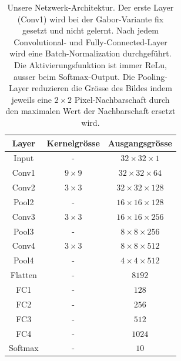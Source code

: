 \begin{table}
	\centering
	\begin{tabular}{|c|c|c|}
		\hline
		Layer & Kernelgrösse & Ausgangsgrösse \\ 
		\hline \hline
		Input & - & $32 \times 32 \times 1$ \\ 
		\hline 
		Conv1 & $9 \times 9$ &  $32 \times 32 \times 64$\\ 
		\hline 
		Conv2 & $3 \times 3$ &  $32 \times 32 \times 128$\\  
		\hline 
		Pool2 & - &  $16 \times 16 \times 128$\\ 
		\hline 
		Conv3 & $3 \times 3$ & $16 \times 16 \times 256$\\ 
		\hline 
		Pool3 & - &  $8 \times 8 \times 256$\\ 
		\hline 
		Conv4 & $3 \times 3$ & $8 \times 8 \times 512$\\ 
		\hline 
		Pool4 & - &  $4 \times 4 \times 512$\\ 
		\hline 
		Flatten & - & $ 8192 $ \\ 
		\hline 
		FC1 & - & $ 128 $ \\ 
		\hline 
		FC2 & - & $ 256 $ \\
		\hline 
		FC3 & - & $ 512 $ \\  
		\hline 
		FC4 & - & $ 1024 $ \\ 
		\hline 
		Softmax & - & $ 10 $ \\ 
		\hline
	\end{tabular} 
	\caption{Unsere Netzwerk-Architektur. Der erste Layer (Conv1) wird bei der Gabor-Variante fix gesetzt und nicht gelernt. Nach jedem Convolutional- und Fully-Connected-Layer wird eine Batch-Normalization durchgeführt. Die Aktivierungsfunktion ist immer ReLu, ausser beim Softmax-Output. Die Pooling-Layer reduzieren die Grösse des Bildes indem jeweils eine $2\times2$ Pixel-Nachbarschaft durch den maximalen Wert der Nachbarschaft ersetzt wird.}
	\label{table:architecture}
\end{table}


